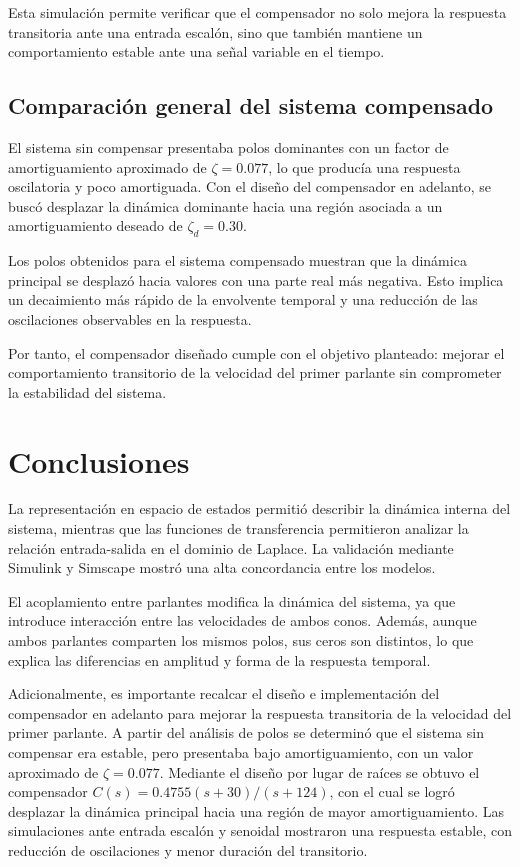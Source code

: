 \documentclass[journal]{IEEEtran}
\begin{document}
Esta simulación permite verificar que el compensador no solo mejora la respuesta transitoria ante una entrada escalón, sino que también mantiene un comportamiento estable ante una señal variable en el tiempo.

\subsection{Comparación general del sistema compensado}

El sistema sin compensar presentaba polos dominantes con un factor de amortiguamiento aproximado de $\zeta=0.077$, lo que producía una respuesta oscilatoria y poco amortiguada. Con el diseño del compensador en adelanto, se buscó desplazar la dinámica dominante hacia una región asociada a un amortiguamiento deseado de $\zeta_d=0.30$.

Los polos obtenidos para el sistema compensado muestran que la dinámica principal se desplazó hacia valores con una parte real más negativa. Esto implica un decaimiento más rápido de la envolvente temporal y una reducción de las oscilaciones observables en la respuesta.

Por tanto, el compensador diseñado cumple con el objetivo planteado: mejorar el comportamiento transitorio de la velocidad del primer parlante sin comprometer la estabilidad del sistema.

\section{Conclusiones}


La representación en espacio de estados permitió describir la dinámica interna del sistema, mientras que las funciones de transferencia permitieron analizar la relación entrada-salida en el dominio de Laplace. La validación mediante Simulink y Simscape mostró una alta concordancia entre los modelos.

El acoplamiento entre parlantes modifica la dinámica del sistema, ya que introduce interacción entre las velocidades de ambos conos. Además, aunque ambos parlantes comparten los mismos polos, sus ceros son distintos, lo que explica las diferencias en amplitud y forma de la respuesta temporal.

Adicionalmente, es importante recalcar el diseño e implementación del compensador en adelanto para mejorar la respuesta transitoria de la velocidad del primer parlante. A partir del análisis de polos se determinó que el sistema sin compensar era estable, pero presentaba bajo amortiguamiento, con un valor aproximado de \(\zeta=0.077\). Mediante el diseño por lugar de raíces se obtuvo el compensador \(C(s)=0.4755(s+30)/(s+124)\), con el cual se logró desplazar la dinámica principal hacia una región de mayor amortiguamiento. Las simulaciones ante entrada escalón y senoidal mostraron una respuesta estable, con reducción de oscilaciones y menor duración del transitorio.
\end{document}
